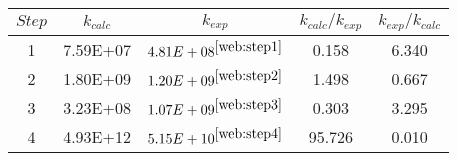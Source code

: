\begin{tabular}{|c|c|c|c|c|}
    \hline
    \rowcolor[HTML]{330001} 
    {\color[HTML]{FFFFFF} \textbf{$Step$}} & {\color[HTML]{FFFFFF} \textbf{$k_{calc}$}} & {\color[HTML]{FFFFFF} \textbf{$k_{exp}$}} & {\color[HTML]{FFFFFF} \textbf{$k_{calc}/k_{exp}$}} & {\color[HTML]{FFFFFF} \textbf{$k_{exp}/k_{calc}$}} \\ \hline
    1 & 7.59E+07                              & $4.81E+08^{\cite{web:step1}}$                             & 0.158                                      & 6.340                                      \\ \hline
    2 & 1.80E+09                              & $1.20E+09^{\cite{web:step2}}$                             & 1.498                                      & 0.667                                      \\ \hline
    3 & 3.23E+08                              & $1.07E+09^{\cite{web:step3}}$                           & 0.303                                      & 3.295                                      \\ \hline
    4 & 4.93E+12                              & $5.15E+10^{\cite{web:step4}}$                             & 95.726                                     & 0.010                                      \\ \hline
\end{tabular}
